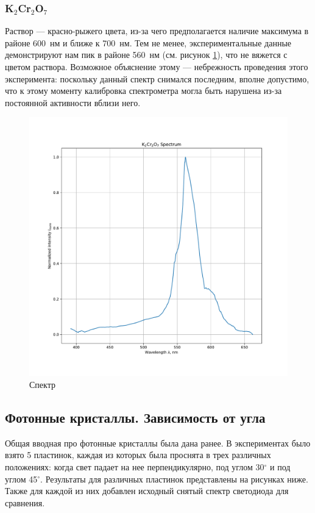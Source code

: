 \documentclass[a4paper, 12pt]{article}
\begin{document}
\subsubsection{K$_2$Cr$_2$O$_7$}

Раствор  --- красно-рыжего цвета, из-за чего предполагается наличие максимума в районе 600~нм и ближе к 700~нм. Тем не менее, экспериментальные данные демонстрируют нам пик в районе 560~нм (см. рисунок \ref{fig:k2cr2o7}), что не вяжется с цветом раствора. Возможное объяснение этому --- небрежность проведения этого эксперимента: поскольку данный спектр снимался последним, вполне допустимо, что к этому моменту калибровка спектрометра могла быть нарушена из-за постоянной активности вблизи него.

\begin{figure}[H]
	\centering
	\includegraphics[width=0.7\linewidth]{k2cr2o7.pdf}
	\caption{Спектр }
	\label{fig:k2cr2o7}
\end{figure}

\subsection{Фотонные кристаллы. Зависимость от угла}

Общая вводная про фотонные кристаллы была дана ранее. В экспериментах было взято 5 пластинок, каждая из которых была проснята в трех различных положениях: когда свет падает на нее перпендикулярно, под углом 30$^\circ$ и под углом 45$^\circ$. Результаты для различных пластинок представлены на рисунках ниже. Также для каждой из них добавлен исходный снятый спектр светодиода для сравнения.
\end{document}
